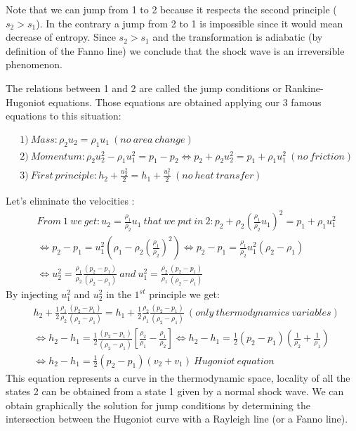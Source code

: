 Note that we can jump from 1 to 2 because it respects the second principle ($ s_2>s_1 $). In the contrary a jump from 2 to 1 is impossible since it would mean decrease of entropy. Since $ s_2>s_1$ and the transformation is adiabatic (by definition of the Fanno line) we conclude that the shock wave is an irreversible phenomenon.

The relations between 1 and 2 are called the jump conditions or Rankine-Hugoniot equations. Those equations are obtained applying our 3 famous equations to this situation:

 \begin{equation}
\begin{aligned}
&1)\ Mass: \rho_2 u_2=\rho_1 u_1 \ (no\ area\ change) \\
&2)\ Momentum: \rho_2 u_2^2-\rho_1 u_1^2=p_1-p_2 \Leftrightarrow p_2+\rho_2 u_2^2=p_1+\rho_1 u_1^2\ (no\ friction)\\
&3)\ First\ principle: h_2+\frac{u_2^2}{2}=h_1+\frac{u_1^2}{2} \ (no\ heat\ transfer)
\end{aligned} 
\end{equation}

Let's eliminate the velocities :
 \begin{equation}
\begin{aligned}
&From\ 1\ we\ get:u_2=\frac{\rho_1}{\rho_2}u_1\ that\ we\ put\ in\ 2: p_2+\rho_2 (\frac{\rho_1}{\rho_2}u_1)^2=p_1+\rho_1 u_1^2 \\
& \Leftrightarrow p_2-p_1=u_1^2(\rho_1-\rho_2(\frac{\rho_1}{\rho_2})^2) \Leftrightarrow p_2-p_1=\frac{\rho_1}{\rho_2}u_1^2(\rho_2-\rho_1) \\ 
&\Leftrightarrow u_2^2=\frac{\rho_1}{\rho_2} \frac{(p_2-p_1)}{(\rho_2-\rho_1)} \ and\  u_1^2=\frac{\rho_2}{\rho_1} \frac{(p_2-p_1)}{(\rho_2-\rho_1)} 
\end{aligned} 
\end{equation}
By injecting $u_1^2$ and $u_2^2$ in the $1^{st}$ principle we get: 
 \begin{equation}
\begin{aligned}
&h_2+\frac{1}{2}\frac{\rho_1}{\rho_2} \frac{(p_2-p_1)}{(\rho_2-\rho_1)}=h_1+\frac{1}{2}\frac{\rho_2}{\rho_1} \frac{(p_2-p_1)}{(\rho_2-\rho_1)} \ (only\ thermodynamics\ variables) \\
& \Leftrightarrow h_2-h_1=\frac{1}{2} \frac{(p_2-p_1)}{(\rho_2-\rho_1)} [\frac{\rho_2}{\rho_1}-\frac{\rho_1}{\rho_2}] \Leftrightarrow h_2-h_1=\frac{1}{2} (p_2-p_1) (\frac{1}{\rho_2}+\frac{1}{\rho_1}) \\
& \Leftrightarrow h_2-h_1=\frac{1}{2} (p_2-p_1) (v_2+v_1) \ Hugoniot \ equation
\end{aligned} 
\end{equation}
This equation represents a curve in the thermodynamic space, locality of all the states 2 can be obtained from a state 1 given by a normal shock wave. We can obtain graphically the solution for jump conditions by determining the intersection between the Hugoniot curve with a Rayleigh line (or a Fanno line).

